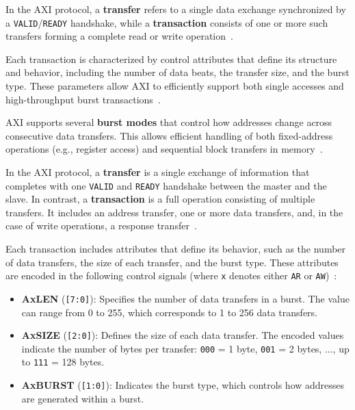 In the AXI protocol, a \textbf{transfer} refers to a single data exchange synchronized by a \texttt{VALID}/\texttt{READY} handshake, while a \textbf{transaction} consists of one or more such transfers forming a complete read or write operation~\cite{arm_ltd_introduction_2020}. 

Each transaction is characterized by control attributes that define its structure and behavior, including the number of data beats, the transfer size, and the burst type. These parameters allow AXI to efficiently support both single accesses and high-throughput burst transactions~\cite{arm_ltd_introduction_2020}.

AXI supports several \textbf{burst modes} that control how addresses change across consecutive data transfers. This allows efficient handling of both fixed-address operations (e.g., register access) and sequential block transfers in memory~\cite{arm_ltd_introduction_2020}.

\iffalse
In the AXI protocol, a \textbf{transfer} is a single exchange of information that completes with one \texttt{VALID} and \texttt{READY} handshake between the master and the slave. In contrast, a \textbf{transaction} is a full operation consisting of multiple transfers. It includes an address transfer, one or more data transfers, and, in the case of write operations, a response transfer~\cite{arm_ltd_introduction_2020}.

Each transaction includes attributes that define its behavior, such as the number of data transfers, the size of each transfer, and the burst type. These attributes are encoded in the following control signals (where \texttt{x} denotes either \texttt{AR} or \texttt{AW})~\cite{arm_ltd_introduction_2020}:

\begin{itemize}
    \item \textbf{AxLEN} (\texttt{[7:0]}): Specifies the number of data transfers in a burst. The value can range from 0 to 255, which corresponds to 1 to 256 data transfers.
    \item \textbf{AxSIZE} (\texttt{[2:0]}): Defines the size of each data transfer. The encoded values indicate the number of bytes per transfer: \texttt{000} = 1 byte, \texttt{001} = 2 bytes, ..., up to \texttt{111} = 128 bytes.
    \item \textbf{AxBURST} (\texttt{[1:0]}): Indicates the burst type, which controls how addresses are generated within a burst.
\end{itemize}

